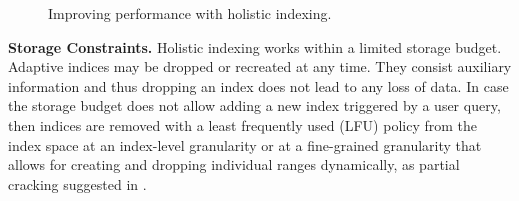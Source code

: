 \begin{figure}[!t]
\begin{center}
{	}%
	\vspace{-0.25 in}
	\caption{Improving performance with holistic indexing.}
	\vspace{-0.7 cm}
	\label{fig:motiv}
     \end{center}%
\end{figure}

\textbf{Storage Constraints.} 
Holistic indexing works within a limited storage budget.
Adaptive indices may be dropped or recreated at any time. 
They consist auxiliary information and thus dropping an index does not lead to any loss of data.
In case the storage budget does not allow adding a new index triggered by a user query, 
then indices are removed with a least frequently used (LFU) policy from the index space
at an index-level granularity or at a fine-grained granularity that allows for creating and dropping individual ranges dynamically, as partial cracking suggested in \cite{DBLP:conf/sigmod/IdreosKM09}.

